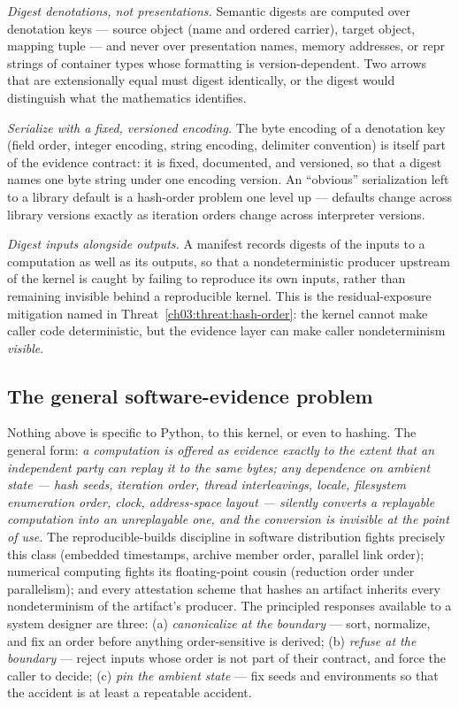 \emph{Digest denotations, not presentations.} Semantic digests are
computed over denotation keys --- source object (name and ordered
carrier), target object, mapping tuple --- and never over presentation
names, memory addresses, or repr strings of container types whose
formatting is version-dependent. Two arrows that are extensionally
equal must digest identically, or the digest would distinguish what the
mathematics identifies.

\emph{Serialize with a fixed, versioned encoding.} The byte encoding of
a denotation key (field order, integer encoding, string encoding,
delimiter convention) is itself part of the evidence contract: it is
fixed, documented, and versioned, so that a digest names one byte
string under one encoding version. An ``obvious'' serialization left to
a library default is a hash-order problem one level up --- defaults
change across library versions exactly as iteration orders change
across interpreter versions.

\emph{Digest inputs alongside outputs.} A manifest records digests of
the inputs to a computation as well as its outputs, so that a
nondeterministic producer upstream of the kernel is caught by failing to
reproduce its own inputs, rather than remaining invisible behind a
reproducible kernel. This is the residual-exposure mitigation named in
Threat~\ref{ch03:threat:hash-order}: the kernel cannot make caller code
deterministic, but the evidence layer can make caller nondeterminism
\emph{visible}.

\subsection{The general software-evidence problem}

Nothing above is specific to Python, to this kernel, or even to hashing.
The general form: \emph{a computation is offered as evidence exactly to the
extent that an independent party can replay it to the same bytes; any
dependence on ambient state --- hash seeds, iteration order, thread
interleavings, locale, filesystem enumeration order, clock, address-space
layout --- silently converts a replayable computation into an unreplayable
one, and the conversion is invisible at the point of use.} The
reproducible-builds discipline in software distribution fights precisely
this class (embedded timestamps, archive member order, parallel link
order); numerical computing fights its floating-point cousin (reduction
order under parallelism); and every attestation scheme that hashes an
artifact inherits every nondeterminism of the artifact's producer. The
principled responses available to a system designer are three: (a)
\emph{canonicalize at the boundary} --- sort, normalize, and fix an order
before anything order-sensitive is derived; (b) \emph{refuse at the
boundary} --- reject inputs whose order is not part of their contract, and
force the caller to decide; (c) \emph{pin the ambient state} --- fix seeds
and environments so that the accident is at least a repeatable accident.

